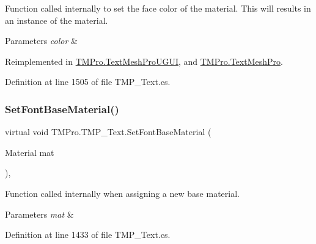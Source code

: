 Function called internally to set the face color of the material. This will results in an instance of the material. 


\begin{DoxyParams}{Parameters}
{\em color} & \\
\hline
\end{DoxyParams}


Reimplemented in \mbox{\hyperlink{class_t_m_pro_1_1_text_mesh_pro_u_g_u_i_ab485c4e2bf309a9485360a19de950fa2}{T\+M\+Pro.\+Text\+Mesh\+Pro\+U\+G\+UI}}, and \mbox{\hyperlink{class_t_m_pro_1_1_text_mesh_pro_a6819493b73133ce05a35daa481101d8e}{T\+M\+Pro.\+Text\+Mesh\+Pro}}.



Definition at line 1505 of file T\+M\+P\+\_\+\+Text.\+cs.

\mbox{\label{class_t_m_pro_1_1_t_m_p___text_a7ce68525afb782cd0d6b3f1a13633c0c}} 
\subsubsection{\texorpdfstring{SetFontBaseMaterial()}{SetFontBaseMaterial()}}
{\footnotesize\ttfamily virtual void T\+M\+Pro.\+T\+M\+P\+\_\+\+Text.\+Set\+Font\+Base\+Material (\begin{DoxyParamCaption}\item[{Material}]{mat }\end{DoxyParamCaption})\hspace{0.3cm}{\ttfamily [protected]}, {\ttfamily [virtual]}}



Function called internally when assigning a new base material. 


\begin{DoxyParams}{Parameters}
{\em mat} & \\
\hline
\end{DoxyParams}


Definition at line 1433 of file T\+M\+P\+\_\+\+Text.\+cs.

\mbox{\label{class_t_m_pro_1_1_t_m_p___text_a726c0894801737f281ecf5656e9ee4d0}} 
